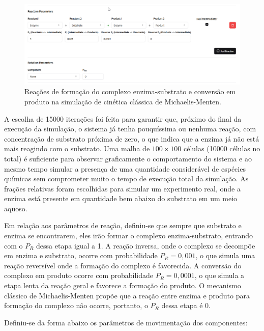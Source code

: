 \documentclass[12pt,oneside]{report}
\begin{document}
\begin{figure}[H]
    \centering
    \includegraphics[width=1\textwidth]{reaction_MM.png}
    \caption{\small Reações de formação do complexo enzima-substrato e conversão em produto na simulação de cinética clássica de Michaelis-Menten.}
    \label{fig:michaelis_menten_reaction}
\end{figure}

A escolha de 15000 iterações foi feita para garantir que, próximo do final da execução da simulação, o sistema já tenha pouquíssima ou nenhuma reação, com concentração de substrato próxima de zero, o que indica que a enzima já não está mais reagindo com o substrato. Uma malha de $100 \times 100$ células (10000 células no total) é suficiente para observar graficamente o comportamento do sistema e ao mesmo tempo simular a presença de uma quantidade considerável de espécies químicas sem comprometer muito o tempo de execução total da simulação. As frações relativas foram escolhidas para simular um experimento real, onde a enzima está presente em quantidade bem abaixo do substrato em um meio aquoso.

Em relação aos parâmetros de reação, definiu-se que sempre que substrato e enzima se encontrarem, eles irão formar o complexo enzima-substrato, entrando com o $P_R$ dessa etapa igual a 1. A reação inversa, onde o complexo se decompõe em enzima e substrato, ocorre com probabilidade $P_R = 0{,}001$, o que simula uma reação reversível onde a formação do complexo é favorecida. A conversão do complexo em produto ocorre com probabilidade $P_R = 0{,}0001$, o que simula a etapa lenta da reação geral e favorece a formação do produto. O mecanismo clássico de Michaelis-Menten propõe que a reação entre enzima e produto para formação do complexo não ocorre, portanto, o $P_R$ dessa etapa é 0.

Definiu-se da forma abaixo os parâmetros de movimentação dos componentes:
\end{document}
